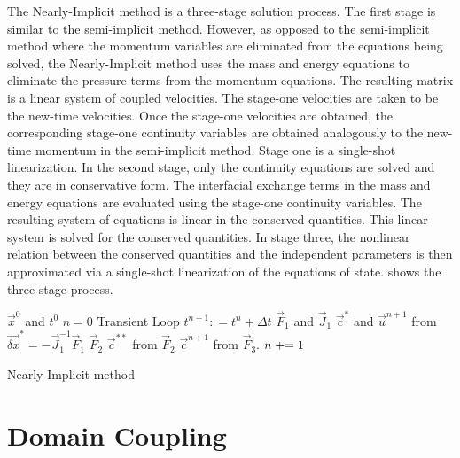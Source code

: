 The Nearly-Implicit method is a three-stage solution process.
The first stage is similar to the semi-implicit method.
However, as opposed to the semi-implicit method where the momentum variables are eliminated from the equations being solved, the Nearly-Implicit method uses the mass and energy equations to eliminate the pressure terms from the momentum equations.
The resulting matrix is a linear system of coupled velocities.
The stage-one velocities are taken to be the new-time velocities.
Once the stage-one velocities are obtained, the corresponding stage-one continuity variables are obtained analogously to the new-time momentum in the semi-implicit method.
Stage one is a single-shot linearization.
In the second stage, only the continuity equations are solved and they are in conservative form.
The interfacial exchange terms in the mass and energy equations are evaluated using the stage-one continuity variables.
The resulting system of equations is linear in the conserved quantities.
This linear system is solved for the conserved quantities.
In stage three, the nonlinear relation between the conserved quantities and the independent parameters is then approximated via a single-shot linearization of the equations of state.
 shows the three-stage process.

\begin{algo}[ht!]
\setlength{\baselineskip}{0.625\baselineskip}
\begin{algorithmic}[1]
\Require $\vec{x}^{0}$ and $t^{0}$
\Set $n = 0$
\Loop \; Transient Loop
    \Set $t^{n+1} : = t^{n} + \Delta t$
	\Calculate $\vec{F}_1$ and $\vec{J}_1$
	\Calculate $\vec{c}^{*}$ and $\vec{u}^{n+1}$ from $\vec{\delta x}^{*} = -\vec{J}^{-1}_1\vec{F}_1$
	\Calculate $\vec{F}_2$
	\Calculate $\vec{c}^{**}$ from $\vec{F}_2$
	\Calculate $\vec{c}^{n+1}$ from $\vec{F}_3$.
	\Set $n \mathrel{+}= 1$
\EndLoop
\end{algorithmic}
\caption{Nearly-Implicit method}
\label{alg:ni}
\end{algo}

\section{Domain Coupling}
\label{sect:code_coupling}

